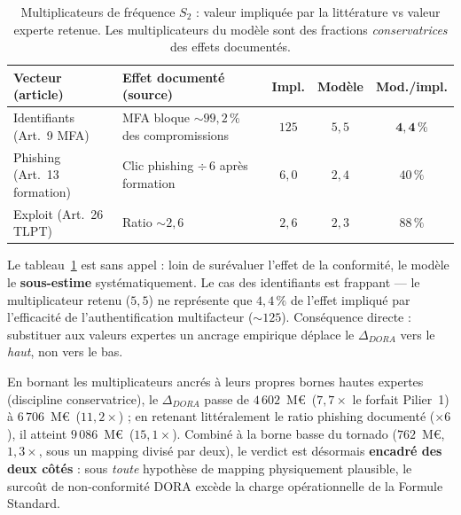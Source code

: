 \documentclass[11pt,a4paper]{article}
\theoremstyle{navystyle}
\theoremstyle{navydef}
\begin{document}
\begin{table}[h]
\centering
\setlength{\tabcolsep}{4pt}
\renewcommand{\arraystretch}{1.25}
\begin{tabular}{>{\raggedright}p{3.9cm} >{\raggedright}p{4.2cm} c c c}
\toprule
\rowcolor{lightblue}
\textbf{Vecteur (article)} & \textbf{Effet documenté (source)} & \textbf{Impl.} & \textbf{Modèle} & \textbf{Mod./impl.} \\
\midrule
Identifiants (Art.~9 MFA) & MFA bloque $\sim99{,}2\,\%$ des compromissions \citep{microsoft2019} & $125$ & $5{,}5$ & $\mathbf{4{,}4\,\%}$ \\
Phishing (Art.~13 formation) & Clic phishing $\div\,6$ après formation & $6{,}0$ & $2{,}4$ & $40\,\%$ \\
Exploit (Art.~26 TLPT) & Ratio $\sim2{,}6$ \citep{enisa2023} & $2{,}6$ & $2{,}3$ & $88\,\%$ \\
\bottomrule
\end{tabular}
\caption{Multiplicateurs de fréquence $S_2$ : valeur impliquée par la littérature vs valeur experte retenue. Les multiplicateurs du modèle sont des fractions \emph{conservatrices} des effets documentés.}
\label{tab:ancrage}
\end{table}

Le tableau~\ref{tab:ancrage} est sans appel : loin de surévaluer l'effet de la conformité, le modèle le \textbf{sous-estime} systématiquement. Le cas des identifiants est frappant --- le multiplicateur retenu ($5{,}5$) ne représente que $4{,}4\,\%$ de l'effet impliqué par l'efficacité de l'authentification multifacteur ($\sim125$). Conséquence directe : substituer aux valeurs expertes un ancrage empirique déplace le $\Delta_{DORA}$ vers le \emph{haut}, non vers le bas.

\begin{formulekey}
En bornant les multiplicateurs ancrés à leurs propres bornes hautes expertes (discipline conservatrice), le $\Delta_{DORA}$ passe de $4\,602$~M\euro\ ($7{,}7\times$ le forfait Pilier~1) à $6\,706$~M\euro\ ($11{,}2\times$) ; en retenant littéralement le ratio phishing documenté ($\times6$), il atteint $9\,086$~M\euro\ ($15{,}1\times$). Combiné à la borne basse du tornado ($762$~M\euro, $1{,}3\times$, sous un mapping divisé par deux), le verdict est désormais \textbf{encadré des deux côtés} : sous \emph{toute} hypothèse de mapping physiquement plausible, le surcoût de non-conformité DORA excède la charge opérationnelle de la Formule Standard.
\end{formulekey}
\end{document}
